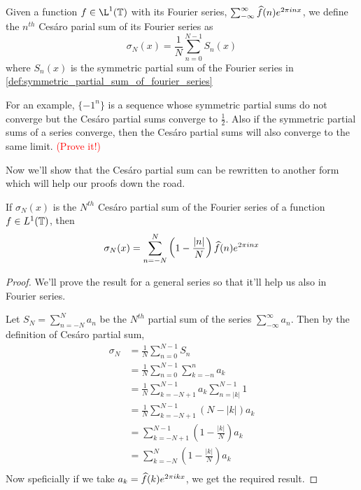   \begin{definition}
    \label{def:cesaro_partial_sum_of_fourier_series}
    Given a function $f \in \L^1(\T)$ with its Fourier series, $\sum_{-\infty}^\infty \widehat{f}(n)e^{2\pi in x}$, we define the $n^{th}$ Ces\'aro parial sum of its Fourier series as
    \begin{displaymath}
      \sigma_N(x) = \frac{1}{N}\sum_{n=0}^{N-1} S_n(x)
    \end{displaymath}
    where $S_n(x)$ is the symmetric partial sum of the Fourier series in \autoref{def:symmetric_partial_sum_of_fourier_series}
  \end{definition}
  For an example, $\{-1^{n}\}$ is a sequence whose symmetric partial sums do not converge but the Ces\'aro partial sums converge to $\frac{1}{2}$. Also if the symmetric partial sums of a series converge, then the Ces\'aro partial sums will also converge to the same limit. \textcolor{red}{(Prove it!)}

  Now we'll show that the Ces\'aro partial sum can be rewritten to another form which will help our proofs down the road.
  \begin{lemma}
    \label{lem:property_of_cesaro_partial_sum}
    If $\sigma_N(x)$ is the $N^{th}$ Ces\'aro partial sum of the Fourier series of a function $f\in L^1(\mathbb T)$, then
    \begin{displaymath}
      \sigma_N(x) = \sum_{n=-N}^N \left(1-\frac{\lvert n\rvert}{N} \right) \widehat{f}(n) e^{2\pi inx}
    \end{displaymath}
  \end{lemma}
  \begin{proof}
    We'll prove the result for a general series so that it'll help us also in Fourier series.

    Let $S_N = \sum_{n=-N}^{N}a_n$ be the $N^{th}$ partial sum of the series $\sum_{-\infty}^{\infty}a_n$. Then by the definition of Ces\'aro partial sum, 
    \begin{align*}
      \sigma_N  &= \frac{1}{N} \sum_{n=0}^{N-1}S_n \\
                &= \frac{1}{N} \sum_{n=0}^{N-1}\sum_{k=-n}^{n}a_k \\
                &= \frac{1}{N} \sum_{k=-N+1}^{N-1} a_k \sum_{n=|k|}^{N-1} 1 \\
                &= \frac{1}{N} \sum_{k=-N+1}^{N-1} \left(N - |k|\right) a_k \\
                &=  \sum_{k=-N+1}^{N-1} \left(1 - \frac{|k|}{N}\right) a_k \\
                &=  \sum_{k=-N}^{N} \left(1 - \frac{|k|}{N}\right) a_k \\ 
    \end{align*}
    Now speficially if we take $a_k = \widehat{f}(k)e^{2\pi ikx}$, we get the required result. 
  \end{proof}

